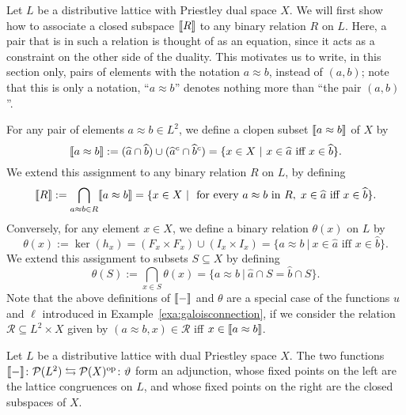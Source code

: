 Let $L$ be a distributive lattice with Priestley dual space $X$. We will first show how to associate a closed subspace $\llbracket {R} \rrbracket$ to any binary relation $R$ on $L$. Here, a pair that is in such a relation is thought of as an equation, since it acts as a constraint on the other side of the duality. This motivates us to write, in this section only, pairs of elements with the notation $a \approx b$, instead of $(a,b)$; note that this is only a notation, ``$a \approx b$'' denotes nothing more than ``the pair $(a,b)$''. 

For any pair of elements $a \approx b \in L^2$, we define a clopen subset $\llbracket {a \approx b} \rrbracket$ of  $X$ by $$\llbracket {a \approx b} \rrbracket := (\widehat{a} \cap \widehat{b}) \cup (\widehat{a}^c \cap \widehat{b}^c) = \{x \in X \ | \ x \in \widehat{a} \text{ iff } x \in \widehat{b} \}.$$
We extend this assignment to any binary relation $R$ on $L$, by defining
$$\llbracket {R} \rrbracket := \bigcap_{a \approx b \in R} \llbracket {a \approx b} \rrbracket = \{x \in X \ | \ \text{ for every } a \approx b \text{ in } R,\; x \in \widehat{a} \text{ iff } x \in \widehat{b} \}.$$
Conversely, for any element $x \in X$, we define a binary relation $\theta(x)$ on $L$ by
$$\theta(x) := \ker(h_x) = (F_x \times F_x) \cup (I_x \times I_x) = \{a \approx b \ | \ x \in \widehat{a} \text{ iff } x \in \widehat{b}\}.$$
We extend this assignment to subsets $S \subseteq X$ by defining
$$\theta(S) := \bigcap_{x \in S} \theta(x) = \{a \approx b \ | \ \widehat{a} \cap S = \widehat{b} \cap S\}.$$
Note that the above definitions of $\llbracket {-} \rrbracket$ and $\theta$ are a special case of the functions $u$ and $\ell$ introduced in Example~\ref{exa:galoisconnection}, if we consider the relation $\mathcal{R} \subseteq L^2 \times X$ given by $(a \approx b, x) \in \mathcal{R}$ iff $x \in \llbracket {a \approx b} \rrbracket$.
\begin{proposition}\label{prop:quotientlattice-subspace}
  Let $L$ be a distributive lattice with dual Priestley space $X$.  The two functions $\llbracket {-} \rrbracket \colon \mathcal{P}(L^2) \leftrightarrows \mathcal{P}(X)^{\mathrm{op}} \colon \vartheta$ form an adjunction, whose fixed points on the left are the lattice congruences on $L$, and whose fixed points on the right are the closed subspaces of $X$.



\end{proposition}
